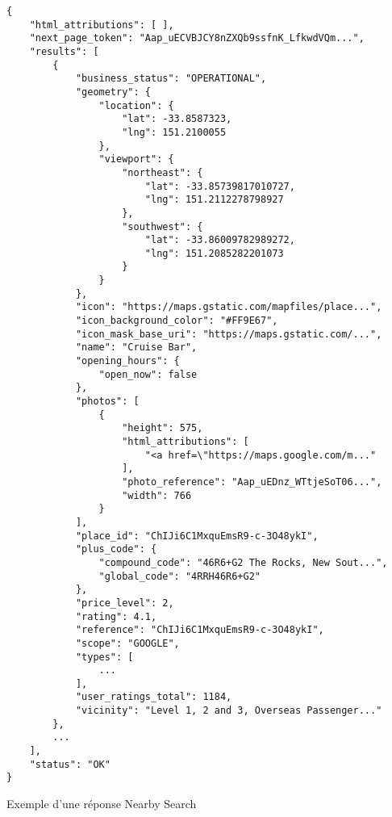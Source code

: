 \begin{code}
\begin{verbatim}
{
    "html_attributions": [ ], 
    "next_page_token": "Aap_uECVBJCY8nZXQb9ssfnK_LfkwdVQm...", 
    "results": [
        {
            "business_status": "OPERATIONAL", 
            "geometry": {
                "location": {
                    "lat": -33.8587323, 
                    "lng": 151.2100055
                }, 
                "viewport": {
                    "northeast": {
                        "lat": -33.85739817010727, 
                        "lng": 151.2112278798927
                    }, 
                    "southwest": {
                        "lat": -33.86009782989272, 
                        "lng": 151.2085282201073
                    }
                }
            }, 
            "icon": "https://maps.gstatic.com/mapfiles/place...", 
            "icon_background_color": "#FF9E67", 
            "icon_mask_base_uri": "https://maps.gstatic.com/...", 
            "name": "Cruise Bar", 
            "opening_hours": {
                "open_now": false
            }, 
            "photos": [
                {
                    "height": 575, 
                    "html_attributions": [
                        "<a href=\"https://maps.google.com/m..."
                    ], 
                    "photo_reference": "Aap_uEDnz_WTtjeSoT06...", 
                    "width": 766
                }
            ], 
            "place_id": "ChIJi6C1MxquEmsR9-c-3O48ykI", 
            "plus_code": {
                "compound_code": "46R6+G2 The Rocks, New Sout...", 
                "global_code": "4RRH46R6+G2"
            }, 
            "price_level": 2, 
            "rating": 4.1, 
            "reference": "ChIJi6C1MxquEmsR9-c-3O48ykI", 
            "scope": "GOOGLE", 
            "types": [
                ...
            ], 
            "user_ratings_total": 1184, 
            "vicinity": "Level 1, 2 and 3, Overseas Passenger..."
        }, 
        ...
    ], 
    "status": "OK"
}
\end{verbatim}
\caption{Exemple d'une réponse Nearby Search}
\end{code}